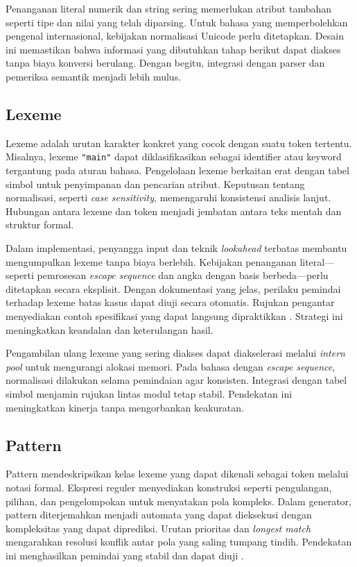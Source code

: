 \documentclass[../main.tex]{subfiles}
\begin{document}
Penanganan literal numerik dan string sering memerlukan atribut tambahan seperti tipe dan nilai yang telah diparsing. Untuk bahasa yang memperbolehkan pengenal internasional, kebijakan normalisasi Unicode perlu ditetapkan. Desain ini memastikan bahwa informasi yang dibutuhkan tahap berikut dapat diakses tanpa biaya konversi berulang. Dengan begitu, integrasi dengan parser dan pemeriksa semantik menjadi lebih mulus.

\subsection{Lexeme}
Lexeme adalah urutan karakter konkret yang cocok dengan suatu token tertentu. Misalnya, lexeme \texttt{"main"} dapat diklasifikasikan sebagai identifier atau keyword tergantung pada aturan bahasa. Pengelolaan lexeme berkaitan erat dengan tabel simbol untuk penyimpanan dan pencarian atribut. Keputusan tentang normalisasi, seperti \emph{case sensitivity}, memengaruhi konsistensi analisis lanjut. Hubungan antara lexeme dan token menjadi jembatan antara teks mentah dan struktur formal.

Dalam implementasi, penyangga input dan teknik \emph{lookahead} terbatas membantu mengumpulkan lexeme tanpa biaya berlebih. Kebijakan penanganan literal—seperti pemrosesan \emph{escape sequence} dan angka dengan basis berbeda—perlu ditetapkan secara eksplisit. Dengan dokumentasi yang jelas, perilaku pemindai terhadap lexeme batas kasus dapat diuji secara otomatis. Rujukan pengantar menyediakan contoh spesifikasi yang dapat langsung dipraktikkan \citep{FlexManual,Mogensen2010}. Strategi ini meningkatkan keandalan dan keterulangan hasil.

Pengambilan ulang lexeme yang sering diakses dapat diakselerasi melalui \emph{intern pool} untuk mengurangi alokasi memori. Pada bahasa dengan \emph{escape sequence}, normalisasi dilakukan selama pemindaian agar konsisten. Integrasi dengan tabel simbol menjamin rujukan lintas modul tetap stabil. Pendekatan ini meningkatkan kinerja tanpa mengorbankan keakuratan.

\subsection{Pattern}
Pattern mendeskripsikan kelas lexeme yang dapat dikenali sebagai token melalui notasi formal. Ekspresi reguler menyediakan konstruksi seperti pengulangan, pilihan, dan pengelompokan untuk menyatakan pola kompleks. Dalam generator, pattern diterjemahkan menjadi automata yang dapat dieksekusi dengan kompleksitas yang dapat diprediksi. Urutan prioritas dan \emph{longest match} mengarahkan resolusi konflik antar pola yang saling tumpang tindih. Pendekatan ini menghasilkan pemindai yang stabil dan dapat diuji \citep{WikiRegex}.
\end{document}
